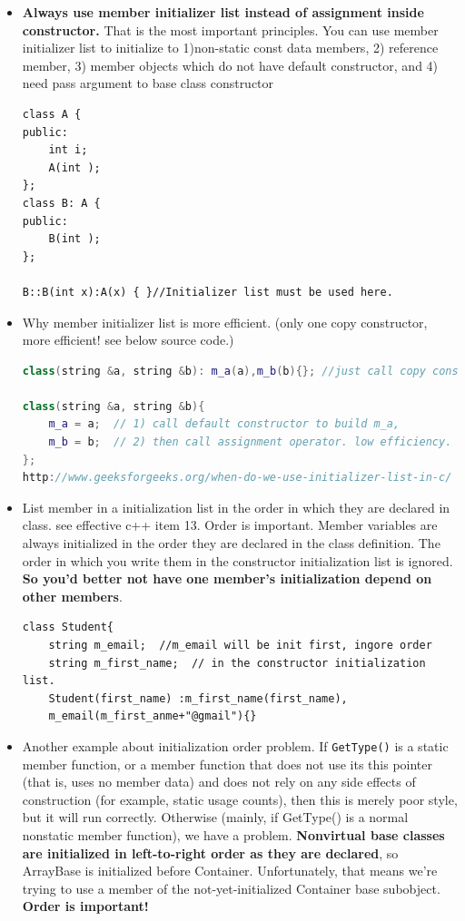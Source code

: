 \documentclass[a4paper,11pt,twoside]{book}
\begin{document}
\begin{itemize}
	\item \textbf{Always use member initializer list instead of assignment inside constructor.} That is the most important principles. You can use member initializer list to initialize to 1)non-static const data members, 2) reference member, 3) member objects which do not have default constructor, and 4) need pass argument to base class constructor
\begin{lstlisting}[numbers=none]
class A {
public:
	int i;
	A(int );
};
class B: A {
public:
	B(int );
};
	
B::B(int x):A(x) { }//Initializer list must be used here.
\end{lstlisting}		
		
	\item Why member initializer list is more efficient. (only one copy constructor, more efficient! see below source code.)

\begin{lstlisting}[frame=single, language=c++]
class(string &a, string &b): m_a(a),m_b(b){}; //just call copy constructor
		
class(string &a, string &b){   
	m_a = a;  // 1) call default constructor to build m_a,
	m_b = b;  // 2) then call assignment operator. low efficiency.
};
http://www.geeksforgeeks.org/when-do-we-use-initializer-list-in-c/  //good reference
\end{lstlisting}

	\item List member in a initialization list in the order in which they are declared in class. see effective c++ item 13. Order is important. Member variables are always initialized in the order they are declared in the class definition. The order in which you write them in the constructor initialization list is ignored.  \textbf{So you'd better not have one member's initialization depend on other members}.
	
\begin{lstlisting}[numbers=none]
class Student{
	string m_email;  //m_email will be init first, ingore order
	string m_first_name;  // in the constructor initialization list.
	Student(first_name) :m_first_name(first_name),
	m_email(m_first_anme+"@gmail"){}
\end{lstlisting}
		
	\item Another example about initialization order problem. If \texttt{GetType()} is a static member function, or a member function that does not use its this pointer (that is, uses no member data) and does not rely on any side effects of construction (for example, static usage counts), then this is merely poor style, but it will run correctly. Otherwise (mainly, if GetType() is a normal nonstatic member function), we have a problem. \textbf{Nonvirtual base classes are initialized in left-to-right order as they are declared}, so ArrayBase is initialized before Container. Unfortunately, that means we're trying to use a member of the not-yet-initialized Container base subobject. \textbf{Order is important!}
		

\end{itemize}
\end{document}
